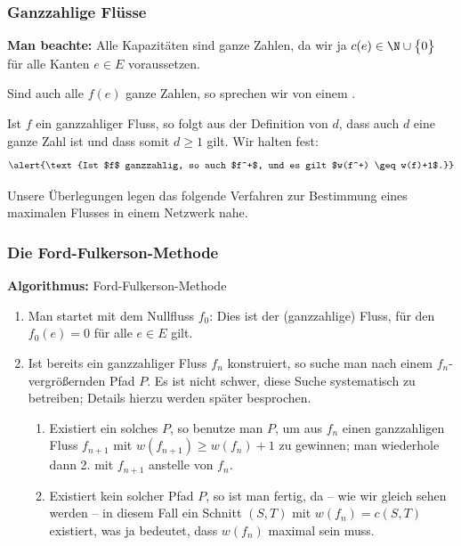 \documentclass[smaller]{beamer}
\begin{document}
\begin{frame}
 \frametitle{Ganzzahlige Flüsse}
 \textbf{Man beachte:} Alle Kapazitäten sind ganze Zahlen, da wir ja $c(e) \in \N \cup \bigl\{ 0 \bigr\}$ für alle Kanten $e \in E$ voraussetzen. \\ \vspace*{0.2cm}

Sind auch alle $f(e)$ ganze Zahlen, so sprechen wir von einem . \\ \vspace*{0.2cm}

Ist $f$ ein ganzzahliger Fluss, so folgt aus der Definition von $d$, dass auch $d$ eine ganze Zahl ist und dass somit $d \geq 1$ gilt. Wir halten fest:
\begin{equation}
\label{eq:9:10}
\alert{\text{Ist $f$ ganzzahlig, so auch $f^+$, und es gilt $w(f^+) \geq w(f)+1$.}}
\end{equation}

Unsere Überlegungen legen das folgende \alert{Verfahren zur Bestimmung eines maximalen Flusses} in einem Netzwerk nahe.
\end{frame}

\begin{frame}
 \frametitle{Die Ford-Fulkerson-Methode}
 \textbf{Algorithmus:} Ford-Fulkerson-Methode
\begin{enumerate}[\bfseries 1.]
\item Man startet mit dem \alert{Nullfluss} $f_0$: Dies ist der (ganzzahlige) Fluss, für den $f_0(e) = 0$ für alle $e \in E$ gilt.
\item Ist bereits ein ganzzahliger Fluss $f_n$ konstruiert, so suche man nach einem $f_n$-vergrößernden Pfad $P$. Es ist nicht schwer, diese Suche systematisch zu betreiben; {Details hierzu werden später besprochen.}
\begin{enumerate}[\bfseries 1.]
\item Existiert ein solches $P$, so benutze man $P$, um aus $f_n$ einen ganzzahligen Fluss $f_{n+1}$ mit $w(f_{n+1}) \geq w(f_n)+1$ zu gewinnen; man wiederhole dann 2. mit $f_{n+1}$ anstelle von $f_n$.
\item Existiert kein solcher Pfad $P$, so ist man fertig, da -- wie wir gleich sehen werden -- in diesem Fall ein Schnitt $(S,T)$ mit $w(f_n) = c(S,T)$ existiert, was ja bedeutet, dass $w(f_n)$ maximal sein muss.
\end{enumerate}
\end{enumerate}
\end{frame}
\end{document}
